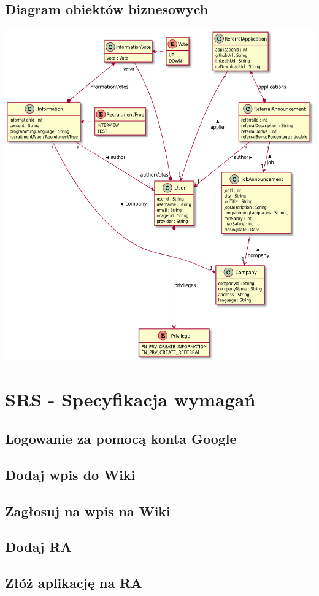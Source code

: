 \documentclass{scrreprt}
\begin{document}
\section{Diagram obiektów biznesowych}
\includegraphics[width=\textwidth, keepaspectratio]{hydra_business_class_diagram.pdf}

\chapter{SRS - Specyfikacja wymagań}
\section{Logowanie za pomocą konta Google}
\section{Dodaj wpis do Wiki}
\section{Zagłosuj na wpis na Wiki}
\section{Dodaj RA}
\section{Złóż aplikację na RA}
\end{document}

